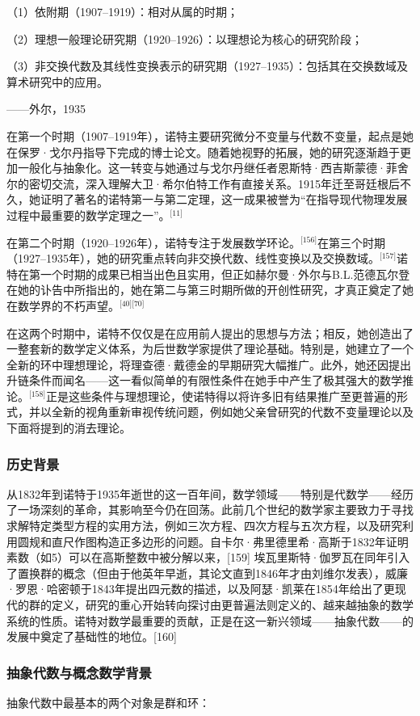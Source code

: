 （1）依附期（1907–1919）：相对从属的时期；

（2）理想一般理论研究期（1920–1926）：以理想论为核心的研究阶段；

（3）非交换代数及其线性变换表示的研究期（1927–1935）：包括其在交换数域及算术研究中的应用。

——外尔，1935

在第一个时期（1907–1919年），诺特主要研究微分不变量与代数不变量，起点是她在保罗·戈尔丹指导下完成的博士论文。随着她视野的拓展，她的研究逐渐趋于更加一般化与抽象化。这一转变与她通过与戈尔丹继任者恩斯特·西吉斯蒙德·菲舍尔的密切交流，深入理解大卫·希尔伯特工作有直接关系。1915年迁至哥廷根后不久，她证明了著名的诺特第一与第二定理，这一成果被誉为“在指导现代物理发展过程中最重要的数学定理之一”。\(^\text{[11]}\)

在第二个时期（1920–1926年），诺特专注于发展数学环论。\(^\text{[156]}\)在第三个时期（1927–1935年），她的研究重点转向非交换代数、线性变换以及交换数域。\(^\text{[157]}\)诺特在第一个时期的成果已相当出色且实用，但正如赫尔曼·外尔与B.L.范德瓦尔登在她的讣告中所指出的，她在第二与第三时期所做的开创性研究，才真正奠定了她在数学界的不朽声望。\(^\text{[40][70]}\)

在这两个时期中，诺特不仅仅是在应用前人提出的思想与方法；相反，她创造出了一整套新的数学定义体系，为后世数学家提供了理论基础。特别是，她建立了一个全新的环中理想理论，将理查德·戴德金的早期研究大幅推广。此外，她还因提出升链条件而闻名——这一看似简单的有限性条件在她手中产生了极其强大的数学推论。\(^\text{[158]}\)正是这些条件与理想理论，使诺特得以将许多旧有结果推广至更普遍的形式，并以全新的视角重新审视传统问题，例如她父亲曾研究的代数不变量理论以及下面将提到的消去理论。
\subsubsection{历史背景}
从1832年到诺特于1935年逝世的这一百年间，数学领域——特别是代数学——经历了一场深刻的革命，其影响至今仍在回荡。此前几个世纪的数学家主要致力于寻找求解特定类型方程的实用方法，例如三次方程、四次方程与五次方程，以及研究利用圆规和直尺作图构造正多边形的问题。自卡尔·弗里德里希·高斯于1832年证明素数（如5）可以在高斯整数中被分解以来，[159] 埃瓦里斯特·伽罗瓦在同年引入了置换群的概念（但由于他英年早逝，其论文直到1846年才由刘维尔发表），威廉·罗恩·哈密顿于1843年提出四元数的描述，以及阿瑟·凯莱在1854年给出了更现代的群的定义，研究的重心开始转向探讨由更普遍法则定义的、越来越抽象的数学系统的性质。诺特对数学最重要的贡献，正是在这一新兴领域——抽象代数——的发展中奠定了基础性的地位。[160]
\subsubsection{抽象代数与概念数学背景}
抽象代数中最基本的两个对象是群和环：

